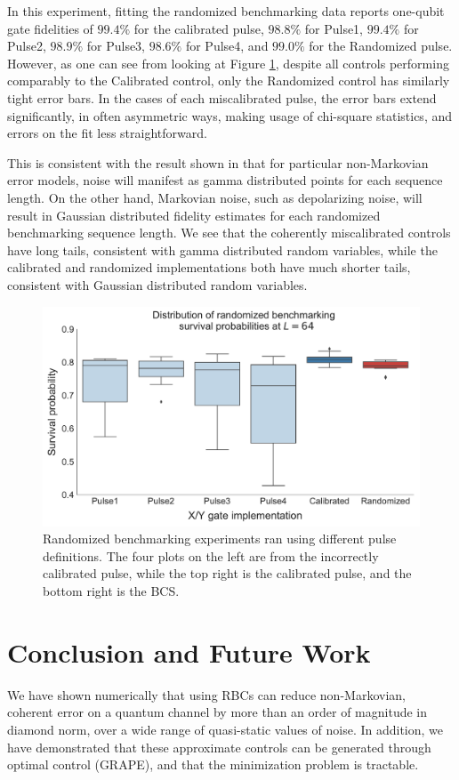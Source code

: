 \documentclass[aps,nofootinbib,pra,notitlepage,twocolumn]{revtex4-1}
\begin{document}
In this experiment, fitting the randomized benchmarking data reports one-qubit gate fidelities of $99.4\%$ for the calibrated pulse, $98.8\%$ for Pulse1, $99.4\%$ for Pulse2, $98.9\%$ for Pulse3, $98.6\%$ for Pulse4, and $99.0\%$ for the Randomized pulse. However, as one can see from looking at Figure \ref{fig:rb}, despite all controls performing comparably to the Calibrated control, only the Randomized control has similarly tight error bars. In the cases of each miscalibrated pulse, the error bars extend significantly, in often asymmetric ways, making usage of chi-square statistics, and errors on the fit less straightforward.

This is consistent with the result shown in \cite{Ball2016} that for particular non-Markovian error models, noise will manifest as gamma distributed points for each sequence length. On the other hand, Markovian noise, such as depolarizing noise, will result in Gaussian distributed fidelity estimates for each randomized benchmarking sequence length. We see that the coherently miscalibrated controls have long tails, consistent with gamma distributed random variables, while the calibrated and randomized implementations both have much shorter tails, consistent with Gaussian distributed random variables. 

\begin{figure}
  \centering
  \includegraphics[width=\columnwidth]{rb_data.pdf}
  \caption{Randomized benchmarking experiments ran using different pulse definitions. The four plots on the left are from the incorrectly calibrated pulse, while the top right is the calibrated pulse, and the bottom right is the BCS.}
  \label{fig:rb}
\end{figure}

\section{Conclusion and Future Work}
We have shown numerically that using RBCs can reduce non-Markovian, coherent error on a quantum channel by more than an order of magnitude in diamond norm, over a wide range of quasi-static values of noise. In addition, we have demonstrated that these approximate controls can be generated through optimal control (GRAPE), and that the minimization problem is tractable. 
\end{document}
